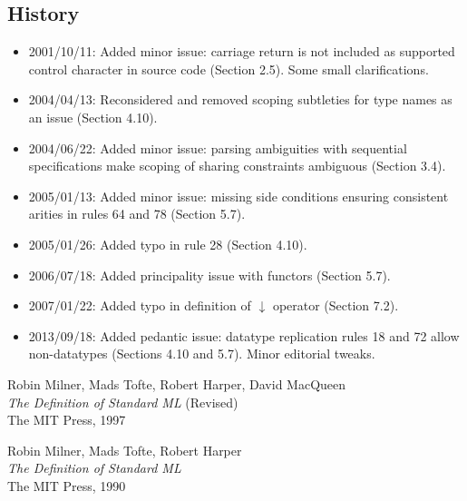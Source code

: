 \documentclass{article}
\begin{document}
\vfill
\pagebreak
\begin{appendix}

\section{History}
\label{history}

\begin{itemize} \setlength{\itemsep}{0em}
\item 2001/10/11: Added minor issue: carriage return is not included as supported control character in source code (Section 2.5). Some small clarifications.
\item 2004/04/13: Reconsidered and removed scoping subtleties for type names as an issue (Section 4.10).
\item 2004/06/22: Added minor issue: parsing ambiguities with sequential specifications make scoping of sharing constraints ambiguous (Section 3.4).
\item 2005/01/13: Added minor issue: missing side conditions ensuring consistent arities in rules 64 and 78 (Section 5.7).
\item 2005/01/26: Added typo in rule 28 (Section 4.10).
\item 2006/07/18: Added principality issue with functors (Section 5.7).
\item 2007/01/22: Added typo in definition of $\downarrow$ operator (Section 7.2).
\item 2013/09/18: Added pedantic issue: datatype replication rules 18 and 72 allow non-datatypes (Sections 4.10 and 5.7). Minor editorial tweaks.
\end{itemize}


\begin{thebibliography}{MTHM97}

Robin Milner, Mads Tofte, Robert Harper, David MacQueen \\
{\it The Definition of Standard ML} (Revised) \\
The MIT Press, 1997

Robin Milner, Mads Tofte, Robert Harper \\
{\it The Definition of Standard ML} \\
The MIT Press, 1990


\end{thebibliography}
\end{appendix}
\end{document}
